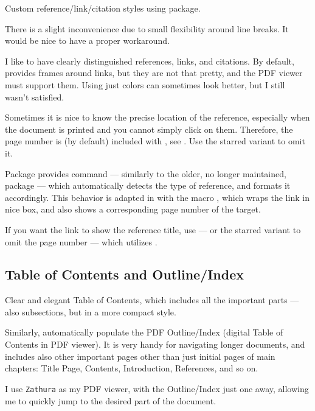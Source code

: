 Custom reference/link/citation styles using  package.
\begin{Note}
    There is a slight inconvenience due to small flexibility around line breaks.
    It would be nice to have a proper workaround.
\end{Note}
\begin{remark}[Rationale]
    I like to have clearly distinguished references, links, and citations.
    By default,  provides frames around links, but they are not that pretty, and the PDF viewer must support them.
    Using just colors can sometimes look better, but I still wasn't satisfied.

    Sometimes it is nice to know the precise location of the reference, especially when the document is printed and you cannot simply click on them.
    Therefore, the page number is (by default) included with \custommacro{\Cref}, see .
    Use the starred variant \custommacro{\Cref*} to omit it.
\end{remark}
\begin{remark} \label{rem:zref-clever}
    Package  provides \macro{\zcref} command --- similarly to the older, no longer maintained,  package --- which automatically detects the type of reference, and formats it accordingly.
    This behavior is adapted in \TeXsis{} with the macro \custommacro{\Cref}, which wraps the link in nice box, and also shows a corresponding page number of the target.

    If you want the link to show the reference title, use \custommacro{\Nref} --- or the starred variant \custommacro{\Nref*} to omit the page number --- which utilizes .
\end{remark}

\subsection{Table of Contents and Outline/Index}%
\label{sub:Table of Contents and Index}

Clear and elegant Table of Contents, which includes all the important parts --- also  subsections, but in a more compact style.

Similarly, automatically populate the PDF Outline/Index (digital Table of Contents in PDF viewer).
It is very handy for navigating longer documents, and includes also other important pages other than just initial pages of main chapters: Title Page, Contents, Introduction, References, and so on.
\begin{remark}
    I use \texttt{Zathura} as my PDF viewer, with the Outline/Index just one  away, allowing me to quickly jump to the desired part of the document.
\end{remark}


